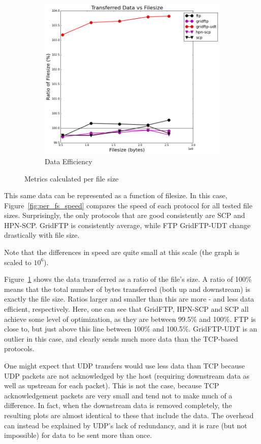 \documentclass{sig-alternate-05-2015}
\begin{document}
\begin{figure}
\begin{subfigure}{.45\textwidth}
	\includegraphics[width=\textwidth]{img/per_filesize/data.png}
	\caption{Data Efficiency}
	\label{fig:per_fs_data}
	\end{subfigure}
\caption{Metrics calculated per file size}
\label{fig:per_fs}
\end{figure}

This same data can be represented as a function of filesize. In this case, Figure~\ref{fig:per_fs_speed} compares the speed of each protocol for all tested file sizes. Surprisingly, the only protocols that are good consistently are SCP and HPN-SCP. GridFTP is consistently average, while FTP GridFTP-UDT change drastically with file size. 

Note that the differences in speed are quite small at this scale (the graph is scaled to $10^6$).

Figure~\ref{fig:per_fs_data} shows the data transferred as a ratio of the file's size. A ratio of 100\% means that the total number of bytes transferred (both up and downstream) is exactly the file size. Ratios larger and smaller than this are more - and less data efficient, respectively.
Here, one can see that GridFTP, HPN-SCP and SCP all achieve some level of optimization, as they are between 99.5\% and 100\%. FTP is close to, but just above this line between 100\% and 100.5\%. GridFTP-UDT is an outlier in this case, and clearly sends much more data than the TCP-based protocols.

One might expect that UDP transfers would use less data than TCP because UDP packets are not acknowledged by the host (requiring downstream data as well as upstream for each packet). This is not the case, because TCP acknowledgement packets are very small and tend not to make much of a difference. In fact, when the downstream data is removed completely, the resulting plots are almost identical to these that include the data. The overhead can instead be explained by UDP's lack of redundancy, and it is rare (but not impossible) for data to be sent more than once.
\end{document}
